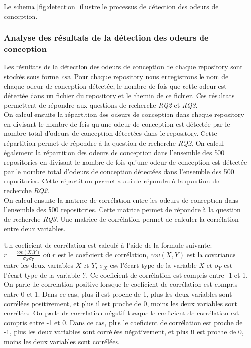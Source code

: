 Le schema \ref{fig:detection} illustre le processus de détection des odeurs de conception.\\


\subsubsection{Analyse des résultats de la détection des odeurs de conception}
\label{sec:Analyse des résultats de la détection des odeurs de conception}
Les résultats de la détection des odeurs de conception de chaque repository sont
stockés sous forme \emph{csv}. Pour chaque repository nous enregistrons le nom de
chaque odeur de conception détectée, le nombre de fois que cette odeur est
détectée dans un fichier du repository et le chemin de ce fichier. Ces résultats
permettent de répondre aux questions de recherche \emph{RQ2} et \emph{RQ3}.\\
On calcul ensuite la répartition des odeurs de conception dans chaque repository
en divisant le nombre de fois qu'une odeur de conception est détectée par le
nombre total d'odeurs de conception détectées dans le repository. Cette
répartition permet de répondre à la question de recherche \emph{RQ2}. On
calcul également la répartition des odeurs de conception dans l'ensemble des 500
repositories en divisant le nombre de fois qu'une odeur de conception est
détectée par le nombre total d'odeurs de conception détectées dans l'ensemble
des 500 repositories. Cette répartition permet aussi de répondre à la
question de recherche \emph{RQ2}.\\

On calcul ensuite la matrice de corrélation entre les odeurs de conception dans
l'ensemble des 500 repositories. Cette matrice permet de répondre à la question
de recherche \emph{RQ3}. Une matrice de corrélation permet
de calculer la corrélation entre deux variables.

Un coeficient de corrélation est calculé à l'aide de la formule suivante:  $r =
  \frac{cov(X,Y)}{\sigma_X \sigma_Y}$  où $r$ est le coeficient de corrélation, $cov(X,Y)$ est la covariance entre les
deux variables $X$ et $Y$, $\sigma_X$ est l'écart type de la variable $X$ et
$\sigma_Y$ est l'écart type de la variable $Y$. Ce coeficient de corrélation est
compris entre -1 et 1. On parle de correlation positive lorsque le coeficient de
corrélation est compris entre 0 et 1. Dans ce cas, plus il est proche de 1, plus les deux variables sont
corrélées positivement, et plus il est proche de 0, moins les deux variables sont
corrélées. On parle de correlation négatif lorsque le coeficient de corrélation
est compris entre -1 et 0. Dans ce cas, plus le coeficient de corrélation est
proche de -1, plus les deux variables sont corrélées négativement, et plus il
est proche de 0, moins les deux variables sont corrélées.\\



